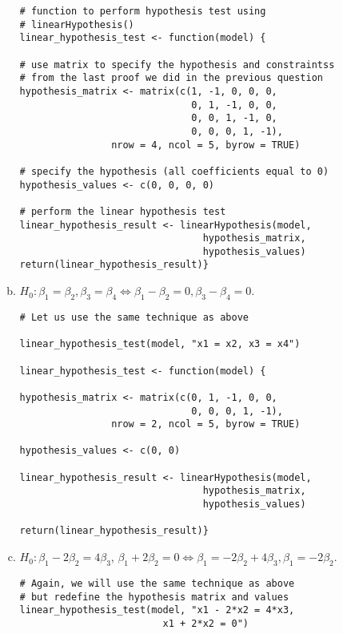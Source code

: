 \documentclass[12pt]{article}
\begin{document}
\begin{enumerate}[1.]
\begin{enumerate}[a.]
                    \begin{verbatim}
# function to perform hypothesis test using 
# linearHypothesis()
linear_hypothesis_test <- function(model) {

# use matrix to specify the hypothesis and constraintss
# from the last proof we did in the previous question
hypothesis_matrix <- matrix(c(1, -1, 0, 0, 0, 
                              0, 1, -1, 0, 0, 
                              0, 0, 1, -1, 0,
                              0, 0, 0, 1, -1),
                nrow = 4, ncol = 5, byrow = TRUE)

# specify the hypothesis (all coefficients equal to 0)
hypothesis_values <- c(0, 0, 0, 0)

# perform the linear hypothesis test
linear_hypothesis_result <- linearHypothesis(model, 
                                hypothesis_matrix, 
                                hypothesis_values)
return(linear_hypothesis_result)}
                    \end{verbatim}
                    \item $H_0: \beta_1 = \beta_2, \beta_3 = \beta_4 \Leftrightarrow \beta_1 - \beta_2 = 0, \beta_3 - \beta_4 = 0$.
                    \begin{verbatim}
# Let us use the same technique as above

linear_hypothesis_test(model, "x1 = x2, x3 = x4")

linear_hypothesis_test <- function(model) {
                        
hypothesis_matrix <- matrix(c(0, 1, -1, 0, 0, 
                              0, 0, 0, 1, -1),
                nrow = 2, ncol = 5, byrow = TRUE)
                
hypothesis_values <- c(0, 0)

linear_hypothesis_result <- linearHypothesis(model, 
                                hypothesis_matrix, 
                                hypothesis_values)

return(linear_hypothesis_result)}
                    \end{verbatim}
                    \item $H_0: \beta_1 - 2\beta_2 = 4\beta_3$, $\beta_1 + 2 \beta_2 = 0 
                    \Leftrightarrow \beta_1 = -2\beta_2 + 4 \beta_3, \beta_1 = -2\beta_2$.
                    \begin{verbatim}
# Again, we will use the same technique as above
# but redefine the hypothesis matrix and values
linear_hypothesis_test(model, "x1 - 2*x2 = 4*x3,
                         x1 + 2*x2 = 0")


\end{verbatim}
\end{enumerate}
\end{enumerate}
\end{document}
